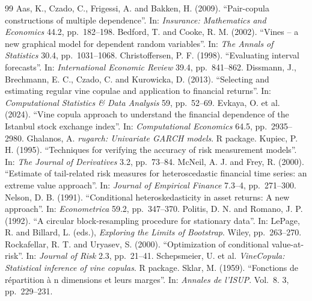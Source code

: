 \begin{correction}
\begin{thebibliography}{99}
 Aas, K., Czado, C., Frigessi, A. and Bakken, H. (2009). ``Pair-copula constructions of multiple dependence''. In: \emph{Insurance: Mathematics and Economics} 44.2, pp.~182--198.
 Bedford, T. and Cooke, R. M. (2002). ``Vines -- a new graphical model for dependent random variables''. In: \emph{The Annals of Statistics} 30.4, pp.~1031--1068.
 Christoffersen, P. F. (1998). ``Evaluating interval forecasts''. In: \emph{International Economic Review} 39.4, pp.~841--862.
 Dissmann, J., Brechmann, E. C., Czado, C. and Kurowicka, D. (2013). ``Selecting and estimating regular vine copulae and application to financial returns''. In: \emph{Computational Statistics \& Data Analysis} 59, pp.~52--69.
 Evkaya, O. et al. (2024). ``Vine copula approach to understand the financial dependence of the Istanbul stock exchange index''. In: \emph{Computational Economics} 64.5, pp.~2935--2980.
 Ghalanos, A. \emph{rugarch: Univariate GARCH models}. R package.
 Kupiec, P. H. (1995). ``Techniques for verifying the accuracy of risk measurement models''. In: \emph{The Journal of Derivatives} 3.2, pp.~73--84.
 McNeil, A. J. and Frey, R. (2000). ``Estimate of tail-related risk measures for heteroscedastic financial time series: an extreme value approach''. In: \emph{Journal of Empirical Finance} 7.3--4, pp.~271--300.
 Nelson, D. B. (1991). ``Conditional heteroskedasticity in asset returns: A new approach''. In: \emph{Econometrica} 59.2, pp.~347--370.
 Politis, D. N. and Romano, J. P. (1992). ``A circular block-resampling procedure for stationary data''. In: LePage, R. and Billard, L. (eds.), \emph{Exploring the Limits of Bootstrap}. Wiley, pp.~263--270.
 Rockafellar, R. T. and Uryasev, S. (2000). ``Optimization of conditional value-at-risk''. In: \emph{Journal of Risk} 2.3, pp.~21--41.
 Schepsmeier, U. et al. \emph{VineCopula: Statistical inference of vine copulas}. R package.
 Sklar, M. (1959). ``Fonctions de répartition à n dimensions et leurs marges''. In: \emph{Annales de l'ISUP}. Vol.~8. 3, pp.~229--231.
\end{thebibliography}
\end{correction}
